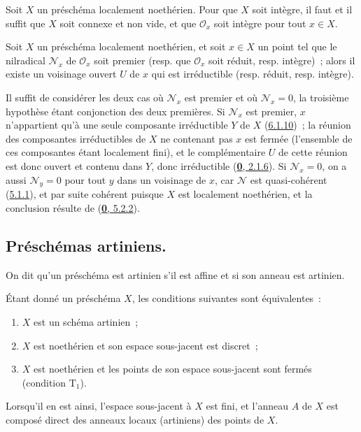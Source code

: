 \begin{corollary}[6.1.12]
\label{I.6.1.12-fr}
Soit $X$ un préschéma localement noethérien. Pour que $X$ soit intègre, il
faut et il suffit que $X$ soit connexe et non vide, et que $\mathscr{O}_x$ soit intègre
pour tout $x\in X$.
\end{corollary}

\begin{proposition}[6.1.13]
\label{I.6.1.13-fr}
Soit $X$ un préschéma localement noethérien, et soit $x\in X$ un point tel que
le nilradical $\mathscr{N}_x$ de $\mathscr{O}_x$ soit premier \textup{(resp.} que
$\mathscr{O}_x$ soit réduit, \textup{resp.} intègre)~; alors il existe un voisinage
ouvert $U$ de $x$ qui est irréductible \textup{(resp.} réduit, \textup{resp.} intègre).
\end{proposition}

Il suffit de considérer les deux cas où $\mathscr{N}_x$ est premier et où
$\mathscr{N}_x=0$, la troisième hypothèse étant conjonction des deux
premières. Si $\mathscr{N}_x$ est premier, $x$ n'appartient qu'à une seule
composante irréductible $Y$ de $X$ (\hyperref[I.6.1.10-fr]{6.1.10})~; la
réunion des composantes irréductibles de $X$ ne contenant pas $x$ est fermée
(l'ensemble de ces composantes étant localement fini), et le complémentaire
$U$ de cette réunion est donc ouvert et contenu dans $Y$, donc irréductible
(\hyperref[0.2.1.6-fr]{\textbf{0}, 2.1.6}). Si $\mathscr{N}_x=0$, on a aussi
$\mathscr{N}_y=0$ pour tout $y$ dans un voisinage de $x$, car $\mathscr{N}$
est quasi-cohérent (\hyperref[I.5.1.1-fr]{5.1.1}), et par suite cohérent
puisque $X$ est localement noethérien, et la conclusion résulte de
(\hyperref[0.5.2.2-fr]{\textbf{0}, 5.2.2}).

\subsection{Préschémas artiniens.}
\label{subsection:I.6.2-fr}

\begin{definition}[6.2.1]
\label{I.6.2.1-fr}
On dit qu'un préschéma est artinien s'il est affine et si son anneau
est artinien.
\end{definition}

\begin{proposition}[6.2.2]
\label{I.6.2.2-fr}
Étant donné un préschéma $X$, les conditions suivantes sont équivalentes~:
\begin{enumerate}
  \item[a)] $X$ est un schéma artinien~;
  \item[b)] $X$ est noethérien et son espace sous-jacent est discret~;
  \item[c)] $X$ est noethérien et les points de son espace sous-jacent sont
    fermés \textup{(condition $\mathrm{T}_1$)}.
\end{enumerate}

Lorsqu'il en est ainsi, l'espace sous-jacent à $X$ est fini, et l'anneau $A$
de $X$ est composé direct des anneaux locaux (artiniens) des points de $X$.
\end{proposition}

